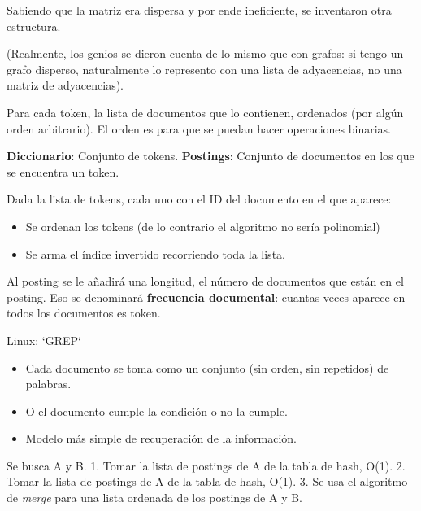\documentclass{fmbnotes}
\begin{document}
\label{sec:indice_invertido}
Sabiendo que la matriz era dispersa y por ende ineficiente, se inventaron otra estructura.

(Realmente, los genios se dieron cuenta de lo mismo que con grafos: si tengo un grafo disperso, naturalmente lo represento con una lista de adyacencias, no una matriz de adyacencias).

Para cada token, la lista de documentos que lo contienen, ordenados (por algún orden arbitrario). El orden es para que se puedan hacer operaciones binarias.

\textbf{Diccionario}: Conjunto de tokens.
\textbf{Postings}: Conjunto de documentos en los que se encuentra un token.

Dada la lista de tokens, cada uno con el ID del documento en el que aparece:

\begin{itemize}
    \item Se ordenan los tokens (de lo contrario el algoritmo no sería polinomial)
    \item Se arma el índice invertido recorriendo toda la lista.
\end{itemize}
Al posting se le añadirá una longitud, el número de documentos que están en el posting. Eso se denominará \textbf{frecuencia documental}: cuantas veces aparece en todos los documentos es token.


Linux: `GREP`

\label{sec:modelamiento}

\label{sec:modelo_de_recuperacion_booleana}


\begin{itemize}
    \item Cada documento se toma como un conjunto (sin orden, sin repetidos) de palabras.
    \item O el documento cumple la condición o no la cumple.
    \item Modelo más simple de recuperación de la información.
\end{itemize}

\label{sec:consultas_textit_and_}

Se busca A y B.
1. Tomar la lista de postings de A de la tabla de hash, O(1). 
2. Tomar la lista de postings de A de la tabla de hash, O(1). 
3. Se usa el algoritmo de \textit{merge} para una lista ordenada de los postings de A y B. 
\end{document}
